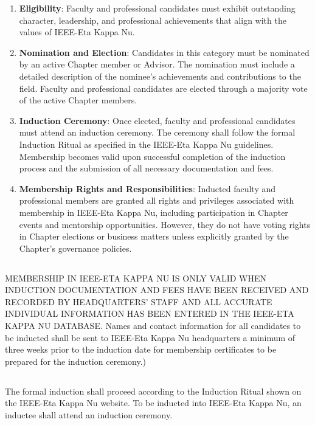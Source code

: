 \documentclass[10pt, oneside]{article}
\begin{document}
\begin{enumerate}
    \item \textbf{Eligibility}: Faculty and professional candidates must exhibit outstanding character, leadership, and professional achievements that align with the values of IEEE-Eta Kappa Nu.

    \item \textbf{Nomination and Election}: Candidates in this category must be nominated by an active Chapter member or Advisor. The nomination must include a detailed description of the nominee’s achievements and contributions to the field. Faculty and professional candidates are elected through a majority vote of the active Chapter members.

    \item \textbf{Induction Ceremony}: Once elected, faculty and professional candidates must attend an induction ceremony. The ceremony shall follow the formal Induction Ritual as specified in the IEEE-Eta Kappa Nu guidelines. Membership becomes valid upon successful completion of the induction process and the submission of all necessary documentation and fees.

    \item \textbf{Membership Rights and Responsibilities}: Inducted faculty and professional members are granted all rights and privileges associated with membership in IEEE-Eta Kappa Nu, including participation in Chapter events and mentorship opportunities. However, they do not have voting rights in Chapter elections or business matters unless explicitly granted by the Chapter's governance policies.
\end{enumerate}

\subsection{}
MEMBERSHIP IN IEEE-ETA KAPPA NU IS ONLY VALID WHEN INDUCTION DOCUMENTATION AND FEES HAVE BEEN RECEIVED AND RECORDED BY
HEADQUARTERS’ STAFF AND ALL ACCURATE INDIVIDUAL INFORMATION HAS BEEN
ENTERED IN THE IEEE-ETA KAPPA NU DATABASE. Names and contact information for all candidates to be inducted shall be sent to IEEE-Eta Kappa Nu headquarters a minimum of three weeks prior to the induction date for membership certificates to be prepared for the induction ceremony.)

\subsection{}
The formal induction shall proceed according to the Induction Ritual shown on the IEEE-Eta Kappa Nu website. To be inducted into IEEE-Eta Kappa Nu, an inductee shall attend an induction ceremony.
\end{document}
